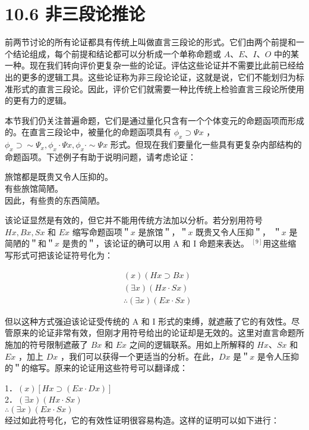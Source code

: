 \section*{10.6 非三段论推论}
前两节讨论的所有论证都具有传统上叫做直言三段论的形式。它们由两个前提和一个结论组成，每个前提和结论都可以分析成一个单称命题或 $A 、 E 、 I 、 O$ 中的某一种。现在我们转向评价更复杂一些的论证。评估这些论证并不需要比此前已经给出的更多的逻辑工具。这些论证称为非三段论论证，这就是说，它们不能划归为标准形式的直言三段论。因此，评价它们就需要一种比传统上检验直言三段论所使用的更有力的逻辑。

本节我们仍关注普遍命题，它们是通过量化只含有一个个体变元的命题函项而形成的。在直言三段论中，被量化的命题函项具有 $\phi_{x} \supset \Psi x$ ， $\phi_{x} \supset \sim \Psi_{x}, \phi_{x} \cdot \Psi x, \phi_{x} \cdot \sim \Psi x$ 形式。但现在我们要量化一些具有更复杂内部结构的命题函项。下述例子有助于说明问题，请考虑论证：

\begin{displayquote}
旅馆都是既贵又令人压抑的。\\
有些旅馆简陋。\\
因此，有些贵的东西简陋。
\end{displayquote}

该论证显然是有效的，但它并不能用传统方法加以分析。若分别用符号 $H x, B x, S x$ 和 $E x$ 缩写命题函项＂$x$ 是旅馆＂，＂$x$ 既贵又令人压抑＂， ＂$x$ 是简陋的＂和＂$x$ 是贵的＂，该论证的确可以用 A 和 I 命题来表达。 ${ }^{[9]}$用这些缩写形式可把该论证符号化为：

$$
\begin{aligned}
& (x)(H x \supset B x) \\
& (\exists x)(H x \cdot S x) \\
& \therefore(\exists x)(E x \cdot S x)
\end{aligned}
$$

但以这种方式强迫该论证受传统的 A 和 I 形式的束缚，就遮蔽了它的有效性。尽管原来的论证非常有效，但刚才用符号给出的论证却是无效的。这里对直言命题所施加的符号限制遮蔽了 $B x$ 和 $E x$ 之间的逻辑联系。用如上所解释的 $H x 、 S x$ 和 $E x$ ，加上 $D x$ ，我们可以获得一个更适当的分析。在此，$D x$ 是＂$x$ 是令人压抑的＂的缩写。原来的论证用这些符号可以翻译成：

1．$(x)[H x \supset(E x \cdot D x)]$\\
2．$(\exists x)(H x \cdot S x)$\\
$\therefore(\exists x)(E x \cdot S x)$\\
经过如此符号化，它的有效性证明很容易构造。这样的证明可以如下进行：

